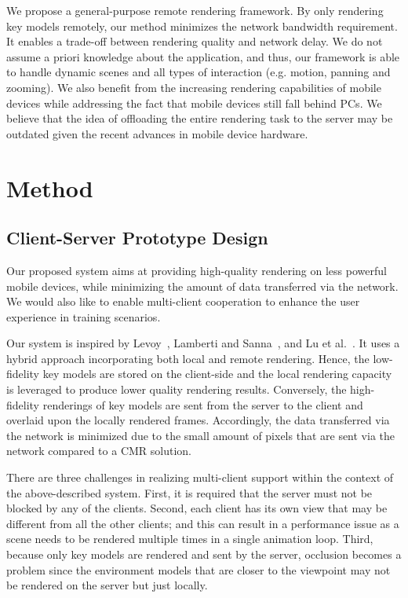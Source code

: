 We propose a general-purpose remote rendering framework. By only rendering key models remotely, our method minimizes the network bandwidth requirement.
It enables a trade-off between rendering quality and network delay.
We do not assume a priori knowledge about the application, and thus, our framework is able to handle dynamic scenes and all types of interaction (e.g. motion, panning and zooming). We also benefit from the increasing rendering capabilities of mobile devices while addressing the fact that mobile devices still fall behind PCs. We believe that the idea of offloading the entire rendering task to the server may be outdated given the recent advances in mobile device hardware.

\section{Method}
\label{sec:hrr:m}

\subsection{Client-Server Prototype Design}
\label{sec:hrr:m:cspd}

Our proposed system aims at providing high-quality rendering on less powerful mobile devices, while minimizing the amount of data transferred via the network. We would also like to enable multi-client cooperation to enhance the user experience in training scenarios.

Our system is inspired by Levoy~\cite{levoy1995}, Lamberti and Sanna~\cite{lamberti2007}, and Lu et al.~\cite{lu2011}. It uses a hybrid approach incorporating both local and remote rendering.
Hence, the low-fidelity key models are stored on the client-side and the local rendering capacity is leveraged to produce lower quality rendering results.
Conversely, the high-fidelity renderings of key models are sent from the server to the client and overlaid upon the locally rendered frames.
Accordingly, the data transferred via the network is minimized due to the small amount of pixels that are sent via the network compared to a CMR solution. 

There are three challenges in realizing multi-client support within the context of the above-described system.
First, it is required that the server must not be blocked by any of the clients.
Second, each client has its own view that may be different from all the other clients; and this can result in a performance issue as a scene needs to be rendered multiple times in a single animation loop.
Third, because only key models are rendered and sent by the server, occlusion becomes a problem since the environment models that are closer to the viewpoint may not be rendered on the server but just locally.

